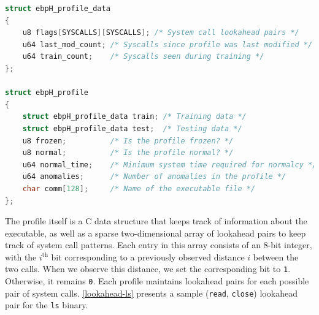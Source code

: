 \documentclass[
  12pt]{findlay}
\begin{document}
\begin{lstlisting}[float={ht}, language=c, label={ebph-profile-struct}, caption={A simplified
definition of the ebpH profile struct.}]
struct ebpH_profile_data
{
    u8 flags[SYSCALLS][SYSCALLS]; /* System call lookahead pairs */
    u64 last_mod_count; /* Syscalls since profile was last modified */
    u64 train_count;    /* Syscalls seen during training */
};

struct ebpH_profile
{
    struct ebpH_profile_data train; /* Training data */
    struct ebpH_profile_data test;  /* Testing data */
    u8 frozen;          /* Is the profile frozen? */
    u8 normal;          /* Is the profile normal? */
    u64 normal_time;    /* Minimum system time required for normalcy */
    u64 anomalies;      /* Number of anomalies in the profile */
    char comm[128];     /* Name of the executable file */
};
\end{lstlisting}

The profile itself is a C data structure that keeps track of information
about the executable, as well as a sparse two-dimensional array of
lookahead pairs \autocite{soma07} to keep track of system call patterns.
Each entry in this array consists of an 8-bit integer, with the
\(i^\text{th}\) bit corresponding to a previously observed distance
\(i\) between the two calls. When we observe this distance, we set the
corresponding bit to \passthrough{\lstinline!1!}. Otherwise, it remains
\passthrough{\lstinline!0!}. Each profile maintains lookahead pairs for
each possible pair of system calls. \autoref{lookahead-ls} presents a
sample (\passthrough{\lstinline!read!}, \passthrough{\lstinline!close!})
lookahead pair for the \passthrough{\lstinline!ls!} binary.
\end{document}
